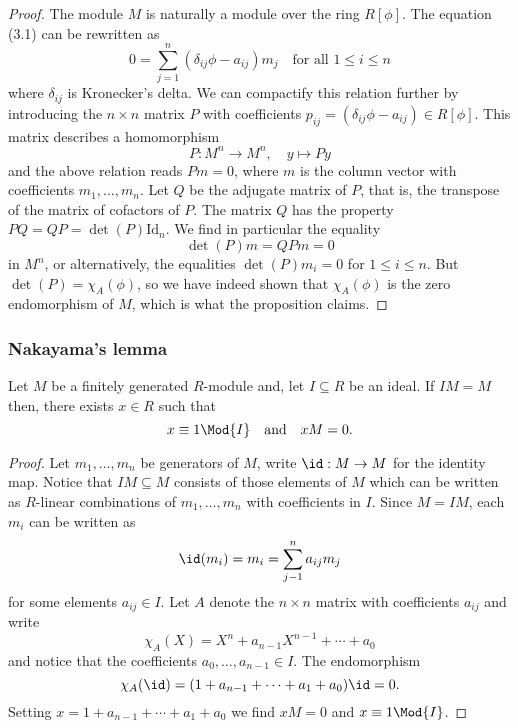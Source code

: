 \documentclass[12pt, a4paper]{article}
\begin{document}
\begin{proof}
    The module \( M \) is naturally a module over the ring \( R[\phi] \). The equation (3.1) can be rewritten as
\[
0 = \sum_{j=1}^{n} (\delta_{ij}\phi - a_{ij})m_j \quad \text{for all } 1 \leq i \leq n
\]
where \( \delta_{ij} \) is Kronecker's delta. We can compactify this relation further by introducing the \( n \times n \) matrix \( P \) with coefficients \( p_{ij} = (\delta_{ij}\phi - a_{ij}) \in R[\phi] \). This matrix describes a homomorphism
\[ P \colon M^n \rightarrow M^n, \quad y \mapsto Py \]
and the above relation reads \( Pm = 0 \), where \( m \) is the column vector with coefficients \( m_1, \ldots, m_n \). Let \( Q \) be the adjugate matrix of \( P \), that is, the transpose of the matrix of cofactors of \( P \). The matrix \( Q \) has the property \( PQ = QP = \det(P) \text{Id}_n \). We find in particular the equality
\[ \det(P)m = QPm = 0 \]
in \( M^n \), or alternatively, the equalities \( \det(P)m_i = 0 \) for \( 1 \leq i \leq n \). But \( \det(P) = \chi_A(\phi) \), so we have indeed shown that \( \chi_A(\phi) \) is the zero endomorphism of \( M \), which is what the proposition claims.
\end{proof}

\subsubsection{Nakayama's lemma}

\begin{mdthm}
    Let \(M\) be a finitely generated \(R\)-module and, let \(I \subseteq R\) be an ideal. If \(IM=M\) then, there exists \(x\in R\) such that 
    \[x\equiv 1 \Mod{I} \quad \text{and} \quad xM=0.\]
\end{mdthm}

\begin{proof}
    Let \(m_1,\ldots, m_n\) be generators of \(M\), write \(\id:M\to M\) for the identity map. Notice that \(IM \subseteq M\) consists of those elements of \(M\) which can be written as \(R\)-linear combinations of \(m_1,\ldots,m_n\) with coefficients in \(I\). Since \(M=IM\), each \(m_i\) can be written as 
    \[\id(m_i)=m_i=\sum_{j-1}^n a_{ij}m_j\]
    for some elements \(a_{ij} \in I\). Let \(A\) denote the \(n\times n\) matrix with coefficients \(a_{ij}\) and write 
    \[\chi_A(X)=X^n+a_{n-1}X^{n-1}+\cdots +a_0\]
    and notice that the coefficients \(a_0,\ldots,a_{n-1}\in I\). 
    The endomorphism
    \[\chi_A(\id)=(1+a_{n-1}+\cdots+a_1+a_0)\id =0.\]
    Setting \(x=1+a_{n-1}+\cdots+a_1+a_0\) we find \(xM=0\) and \(x\equiv 1 \Mod{I}\).
\end{proof}
\end{document}
